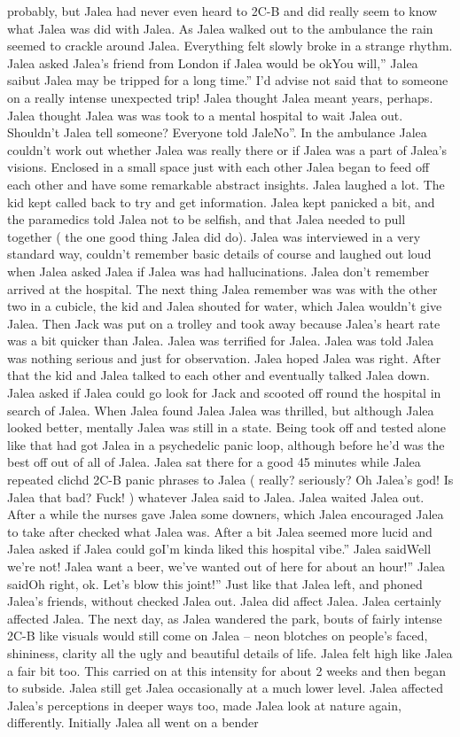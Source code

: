 \documentclass[12pt]{book}
\begin{document}
probably, but Jalea had never even heard to 2C-B and did really seem to know what Jalea was did with Jalea. As Jalea walked out to the ambulance the rain seemed to crackle around Jalea. Everything felt slowly broke in a strange rhythm. Jalea asked Jalea's friend from London if Jalea would be okYou will,'' Jalea saibut Jalea may be tripped for a long time.'' I'd advise not said that to someone on a really intense unexpected trip! Jalea thought Jalea meant years, perhaps. Jalea thought Jalea was was took to a mental hospital to wait Jalea out. Shouldn't Jalea tell someone? Everyone told JaleNo''. In the ambulance Jalea couldn't work out whether Jalea was really there or if Jalea was a part of Jalea's visions. Enclosed in a small space just with each other Jalea began to feed off each other and have some remarkable abstract insights. Jalea laughed a lot. The kid kept called back to try and get information. Jalea kept panicked a bit, and the paramedics told Jalea not to be selfish, and that Jalea needed to pull together ( the one good thing Jalea did do). Jalea was interviewed in a very standard way, couldn't remember basic details of course and laughed out loud when Jalea asked Jalea if Jalea was had hallucinations. Jalea don't remember arrived at the hospital. The next thing Jalea remember was was with the other two in a cubicle, the kid and Jalea shouted for water, which Jalea wouldn't give Jalea. Then Jack was put on a trolley and took away because Jalea's heart rate was a bit quicker than Jalea. Jalea was terrified for Jalea. Jalea was told Jalea was nothing serious and just for observation. Jalea hoped Jalea was right. After that the kid and Jalea talked to each other and eventually talked Jalea down. Jalea asked if Jalea could go look for Jack and scooted off round the hospital in search of Jalea. When Jalea found Jalea Jalea was thrilled, but although Jalea looked better, mentally Jalea was still in a state. Being took off and tested alone like that had got Jalea in a psychedelic panic loop, although before he'd was the best off out of all of Jalea. Jalea sat there for a good 45 minutes while Jalea repeated clichd 2C-B panic phrases to Jalea ( really? seriously? Oh Jalea's god! Is Jalea that bad? Fuck! ) whatever Jalea said to Jalea. Jalea waited Jalea out. After a while the nurses gave Jalea some downers, which Jalea encouraged Jalea to take after checked what Jalea was. After a bit Jalea seemed more lucid and Jalea asked if Jalea could goI'm kinda liked this hospital vibe.'' Jalea saidWell we're not! Jalea want a beer, we've wanted out of here for about an hour!'' Jalea saidOh right, ok. Let's blow this joint!'' Just like that Jalea left, and phoned Jalea's friends, without checked Jalea out. Jalea did affect Jalea. Jalea certainly affected Jalea. The next day, as Jalea wandered the park, bouts of fairly intense 2C-B like visuals would still come on Jalea -- neon blotches on people's faced, shininess, clarity all the ugly and beautiful details of life. Jalea felt high like Jalea a fair bit too. This carried on at this intensity for about 2 weeks and then began to subside. Jalea still get Jalea occasionally at a much lower level. Jalea affected Jalea's perceptions in deeper ways too, made Jalea look at nature again, differently. Initially Jalea all went on a bender 
\end{document}
